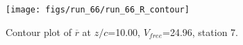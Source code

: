 \begin{figure}[H]
\centering
\texttt{[image: figs/run\_66/run\_66\_R\_contour]}
\caption{Contour plot of $\overline{r}$ at $z/c$=10.00, $V_{free}$=24.96, station 7.}
\label{fig:run_66_R_contour}
\end{figure}


